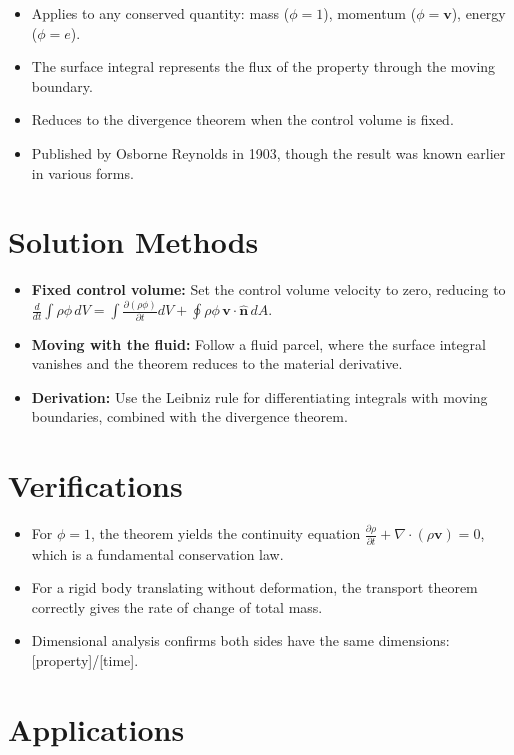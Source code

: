 \documentclass[11pt,openright]{book}
\begin{document}
\begin{itemize}
    \item Applies to any conserved quantity: mass ($\phi = 1$), momentum ($\phi = \mathbf{v}$), energy ($\phi = e$).
    \item The surface integral represents the flux of the property through the moving boundary.
    \item Reduces to the divergence theorem when the control volume is fixed.
    \item Published by Osborne Reynolds in 1903, though the result was known earlier in various forms.
\end{itemize}
\section*{Solution Methods}

\begin{itemize}
    \item \textbf{Fixed control volume:} Set the control volume velocity to zero, reducing to $\frac{d}{dt}\int\rho\phi\,dV = \int\frac{\partial(\rho\phi)}{\partial t}dV + \oint\rho\phi\,\mathbf{v}\cdot\hat{\mathbf{n}}\,dA$.
    \item \textbf{Moving with the fluid:} Follow a fluid parcel, where the surface integral vanishes and the theorem reduces to the material derivative.
    \item \textbf{Derivation:} Use the Leibniz rule for differentiating integrals with moving boundaries, combined with the divergence theorem.
\end{itemize}
\section*{Verifications}

\begin{itemize}
    \item For $\phi = 1$, the theorem yields the continuity equation $\frac{\partial\rho}{\partial t} + \nabla\cdot(\rho\mathbf{v}) = 0$, which is a fundamental conservation law.
    \item For a rigid body translating without deformation, the transport theorem correctly gives the rate of change of total mass.
    \item Dimensional analysis confirms both sides have the same dimensions: [property]/[time].
\end{itemize}
\section*{Applications}
\end{document}
